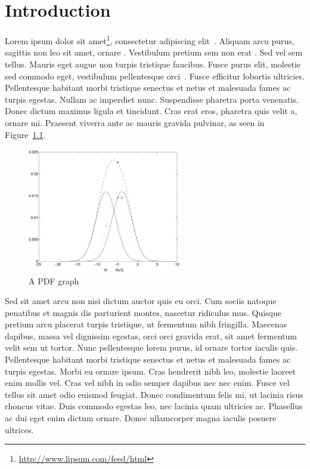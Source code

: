 
\chapter{Introduction}

Lorem ipsum dolor sit amet\footnote{\url{http://www.lipsum.com/feed/html}}, consectetur adipiscing elit~\cite{Signer2008}. Aliquam arcu purus, sagittis non leo sit amet, ornare . Vestibulum pretium sem non erat . Sed vel sem tellus. Mauris eget augue non turpis tristique faucibus. Fusce purus elit, molestie sed commodo eget, vestibulum pellentesque orci~\cite{Jones2005,Whittaker2001}. Fusce efficitur lobortis ultricies. Pellentesque habitant morbi tristique senectus et netus et malesuada fames ac turpis egestas. Nullam ac imperdiet nunc. Suspendisse pharetra porta venenatis. Donec dictum maximus ligula et tincidunt. Cras erat eros, pharetra quis velit a, ornare  mi. Praesent viverra ante ac mauris gravida pulvinar, as seen in Figure~\ref{fig:graph}.

\begin{figure}[htbp]
  \centering
    \includegraphics[width=0.6\textwidth]{images/graph}
    \caption{A PDF graph}
    \label{fig:graph}
\end{figure}

Sed sit amet arcu non nisi dictum auctor quis eu orci. Cum sociis natoque penatibus et magnis dis parturient montes, nascetur ridiculus mus. Quisque pretium arcu placerat turpis tristique, ut fermentum nibh fringilla. Maecenas dapibus, massa vel dignissim egestas, orci orci gravida erat, sit amet fermentum velit sem ut tortor. Nunc pellentesque lorem purus, id ornare tortor iaculis quis. Pellentesque habitant morbi tristique senectus et netus et malesuada fames ac turpis egestas. Morbi eu ornare ipsum. Cras hendrerit nibh leo, molestie laoreet enim mollis vel. Cras vel nibh in odio semper dapibus nec nec enim. Fusce vel tellus sit amet odio euismod feugiat. Donec condimentum felis mi, ut lacinia risus rhoncus vitae. Duis commodo egestas leo, nec lacinia quam ultricies ac. Phasellus ac dui eget enim dictum ornare. Donec ullamcorper magna iaculis posuere ultrices.




